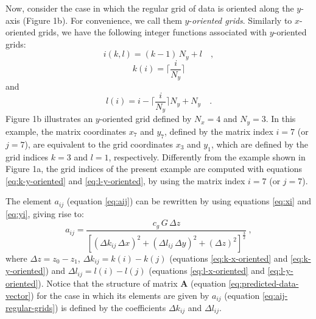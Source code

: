 Now, consider the case in which the regular grid of data is oriented along 
the $y$-axis (Figure 1b). For convenience, we call them $y$-\textit{oriented grids}.
Similarly to $x$-oriented grids, we have the following integer functions associated with
$y$-oriented grids:
\begin{equation}
i(k, l) = (k - 1) \, N_{y} + l \quad ,
\label{eq:i-y-oriented}
\end{equation}
\begin{equation}
k(i) = \Bigg\lceil \frac{i}{N_{y}} \Bigg\rceil
\label{eq:k-y-oriented}
\end{equation}
and
\begin{equation}
l(i) = i - \Bigg\lceil \frac{i}{N_{y}} \Bigg\rceil N_{y} + N_{y} \quad .
\label{eq:l-y-oriented}
\end{equation}
Figure 1b illustrates an $y$-oriented grid defined by $N_{x} = 4$ and $N_{y} = 3$.
In this example, the matrix coordinates $x_{7}$ and $y_{7}$, defined by the matrix index 
$i = 7$ (or $j = 7$), are equivalent to the grid coordinates $x_{3}$ and $y_{1}$, which are 
defined by the grid indices $k = 3$ and $l = 1$, respectively. Differently from the example
shown in Figure 1a, the grid indices of the present example are 
computed with equations \ref{eq:k-y-oriented} and \ref{eq:l-y-oriented}, by using the 
matrix index $i = 7$ (or $j = 7$).

The element $a_{ij}$ (equation \ref{eq:aij}) can be rewritten 
by using equations \ref{eq:xi} and \ref{eq:yi}, giving rise to:
\begin{equation}
a_{ij} = \frac{c_{g} \, G \, \Delta z}{ \left[ 
	\left( \Delta k_{ij} \, \Delta x \right)^{2} + 
	\left( \Delta l_{ij} \, \Delta y \right)^{2} + 
	\left( \Delta z \right)^{2} \right]^{\frac{3}{2}}} \: ,
\label{eq:aij-regular-grids}
\end{equation}
where $\Delta z = z_{0} - z_{1}$, 
$\Delta k_{ij} = k(i) - k(j)$ (equations \ref{eq:k-x-oriented} and \ref{eq:k-y-oriented}) and
$\Delta l_{ij} = l(i) - l(j)$ (equations \ref{eq:l-x-oriented} and \ref{eq:l-y-oriented}).
Notice that the structure of matrix $\mathbf{A}$ (equation \ref{eq:predicted-data-vector}) for 
the case in which its elements are given by $a_{ij}$ (equation \ref{eq:aij-regular-grids}) is 
defined by the coefficients $\Delta k_{ij}$ and $\Delta l_{ij}$.

